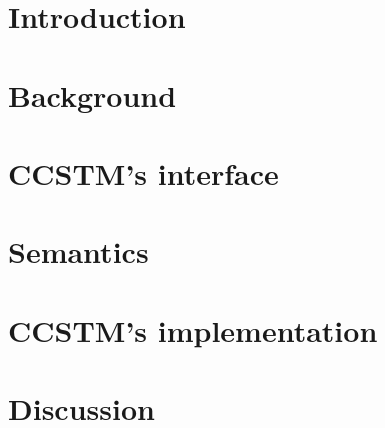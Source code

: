 \documentclass[preprint]{sigplanconf}
\newcommand{\codesec}[1]{{\fontsize{10}{12}\selectfont \tt \bfseries #1}}
\newcommand{\typesec}[1]{{\codesec{\itshape #1}}}
\newcommand{\typeparamsec}[1]{{\codesec{\bfseries #1}}}
\newcommand{\xtypesec}[2]{{\typesec{#1}\typeparamsec{[#2]}}}
\begin{document}

\terms
\xterms

\keywords
\xkeywords

\section{Introduction}
\label{sec:intro}


\section{Background}
\label{sec:library}


\section{CCSTM's interface}
\label{sec:ref}


\section{Semantics}
\label{sec:semantics}


\section{CCSTM's implementation}
\label{sec:impl}


\section{Discussion}
\label{sec:discussion}





\end{document}
